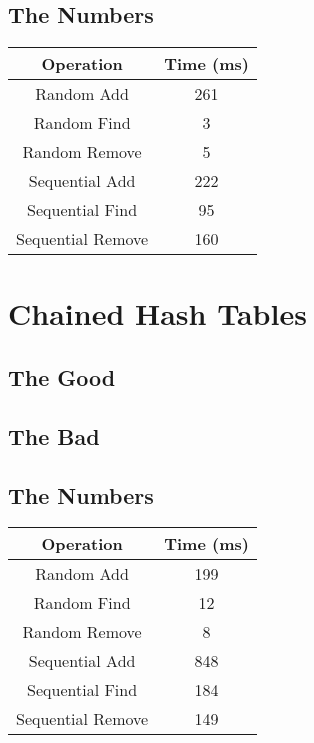 \documentclass{muformallab}
\begin{document}
  \subsection{The Numbers}

  \begin{center}
    \begin{tabular}{c c}
      Operation & Time (ms) \\
      \hline
      Random Add & 261 \\
      Random Find & 3 \\
      Random Remove & 5 \\
      Sequential Add & 222 \\
      Sequential Find & 95 \\
      Sequential Remove & 160 \\
    \end{tabular}
  \end{center}

  \section{Chained Hash Tables}

  \subsection{The Good}

  \subsection{The Bad}

  \subsection{The Numbers}

  \begin{center}
    \begin{tabular}{c c}
      Operation & Time (ms) \\
      \hline
      Random Add & 199 \\
      Random Find & 12 \\
      Random Remove & 8 \\
      Sequential Add & 848 \\
      Sequential Find & 184 \\
      Sequential Remove & 149 \\
    \end{tabular}
  \end{center}
\end{document}
